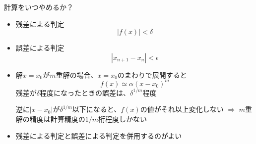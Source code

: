 \begin{frame}[t,fragile]{計算をいつやめるか？}
  \begin{itemize}
  \item 残差による判定
    \[
    |f(x)| < \delta
    \]
  \item 誤差による判定
    \[
    | x_{n+1} - x_{n} | < \epsilon
    \]
  \item 解$x=x_0$が$m$重解の場合、$x=x_0$のまわりで展開すると
    \[
    f(x) \simeq \alpha (x-x_0)^m
    \]
    残差が$\delta$程度になったときの誤差は、$\delta^{1/m}$程度

    逆に$|x-x_0|$が$\delta^{1/m}$以下になると、$f(x)$の値がそれ以上変化しない $\Rightarrow$ $m$重解の精度は計算精度の$1/m$桁程度しかない

  \item 残差による判定と誤差による判定を併用するのがよい
  \end{itemize}
\end{frame}
